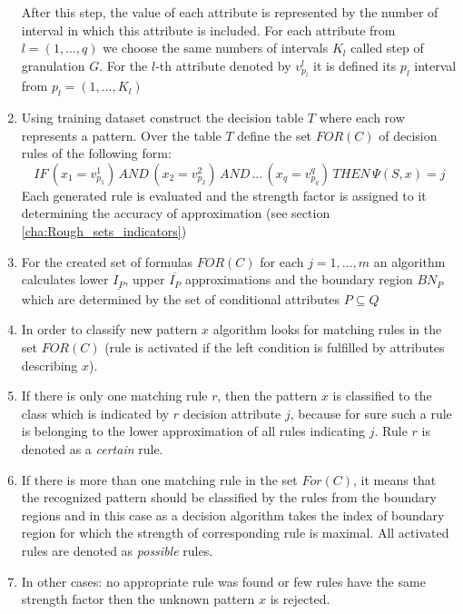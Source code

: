\begin{enumerate}
        After this step, the value of each attribute is represented 
        by the number of interval in which this attribute is included. For each
        attribute from $l=(1, \ldots , q)$ we choose the same numbers of
        intervals $K_l$ called step of granulation $G$. For the $l$-th attribute 
        denoted by $v^l_{p_l}$ it is defined its $p_l$ interval from $p_l=(1, \ldots, K_l)$
    \item Using training dataset construct the decision table $T$ where each
        row represents a pattern. Over the table $T$ define the set $FOR(C)$ of decision rules of
        the following form:
        $$IF \, (x_1 = v_{p_1}^1) \, AND \, (x_2=v_{p_2}^2) \, AND \, \ldots \,
        (x_q=v_{p_q}^q) \, THEN \, \Psi(S, x)=j$$
        Each generated rule is evaluated and the strength factor is assigned to
        it determining the accuracy of approximation (see section \ref{cha:Rough_sets_indicators})
    \item For the created set of formulas $FOR(C)$ for each $j=1, \ldots, m$
        an algorithm calculates lower $\underline{I_P}$, upper $\overline{I_P}$ approximations and the boundary
        region $BN_P$ which are determined by the set of conditional attributes $P
        \subseteq Q$
    \item In order to classify new pattern $x$ algorithm looks for matching rules in the
        set $FOR(C)$ (rule is activated if the left condition is fulfilled by
        attributes describing $x$).
    \item If there is only one matching rule $r$, then the pattern $x$ is
        classified to the class which is indicated by $r$ decision attribute $j$, 
        because for sure such a rule is belonging to the lower approximation of all rules 
        indicating $j$. Rule $r$ is denoted as a \textit{certain} rule.
    \item If there is more than one matching rule in the set $For(C)$, 
        it means that the recognized pattern should be classified by the 
        rules from the boundary regions and in this case as a decision
        algorithm takes the index of boundary region for which the strength of corresponding 
        rule is maximal. All activated rules are denoted as \textit{possible}
        rules.
    \item In other cases: no appropriate rule was found or few rules have the same strength
        factor then the unknown pattern $x$ is rejected.
\end{enumerate}
